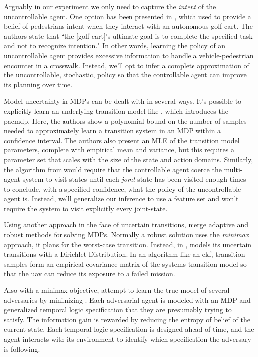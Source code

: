     Arguably in our experiment we only need to capture the \textit{intent} of the uncontrollable agent. One option has
    been presented in \cite{bandyopadhyay2013intention}, which used  to provide a belief of pedestrians
    intent when they interact with an autonomous golf-cart.  The authors state that ``the [golf-cart]'s ultimate goal is
    to complete the specified task and not to recognize intention." In other words, learning the policy of an
    uncontrollable agent provides excessive information to handle a vehicle-pedestrian encounter in a crosswalk.
    Instead, we'll opt to infer a complete approximation of the uncontrollable, stochastic, policy so that the
    controllable agent can improve its planning over time.

    Model uncertainty in \ac{MDP}s can be dealt with in several ways. It's possible to explicitly learn an underlying
    transition model like \cite{Fu-RSS-14}, which introduces the \ac{pacmdp}. Here, the authors show a polynomial bound
    on the number of samples needed to approximately learn a transition system in an MDP within a confidence interval.
    The authors also present an \ac{MLE} of the transition model parameters, complete with empirical mean and variance,
    but this requires a parameter set that scales with the size of the state and action domains. Similarly, the \Rmax
    algorithm from \cite{brafman2002r} would require that the controllable agent coerce the multi-agent system to visit
    states until each \textit{joint} state has been visited enough times to conclude, with a specified confidence, what
    the policy of the uncontrollable agent is. Instead, we'll generalize our inference to use a feature set and won't
    require the system to visit explicitly every joint-state.

    Using another approach in the face of uncertain transitions, \cite{bertuccelli2012robust} merge adaptive and robust
    methods for solving \acp{MDP}. Normally a robust solution uses the \textit{minimax} approach, it plans for the
    worst-case transition. Instead, in \cite{bertuccelli2012robust},  models its uncertain transitions with a
    Dirichlet Distribution. In an algorithm like an \ac{ekf}, transition samples form an empirical covariance matrix of
    the systems transition model so that the \ac{uav} can reduce its exposure to a failed mission.

    Also with a minimax objective, \cite{chinchali2017multi} attempt to learn the true model of several adversaries by
    minimizing . Each adversarial agent is modeled with an \ac{MDP} and
    generalized temporal logic specification that they are presumably trying to satisfy. The information gain is
    rewarded by reducing the entropy of belief of the current state. Each temporal logic specification is designed ahead
    of time, and the agent interacts with its environment to identify which specification the adversary is following.

